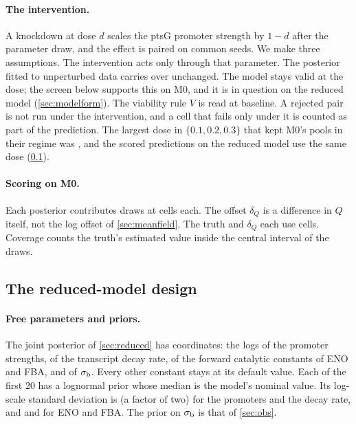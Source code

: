 \paragraph{The intervention.} A knockdown at dose $d$ scales the ptsG promoter strength
by $1 - d$ after the parameter draw, and the effect is paired on common seeds. We make three
assumptions. The intervention acts only through that parameter. The posterior fitted to
unperturbed data carries over unchanged. The model stays valid at the dose; the screen below supports this on M0, and it is in question on the reduced model (\cref{sec:modelform}). The viability rule $V$
is read at baseline. A rejected pair is not run under the intervention, and a cell that
fails only under it is counted as part of the prediction. The largest dose in
$\{0.1, 0.2, 0.3\}$ that kept M0's pools in their regime was , and the
scored predictions on the reduced model use the same dose (\cref{sec:reduceddesign}).

\paragraph{Scoring on M0.} Each posterior contributes  draws at
 cells each. The offset $\delta_Q$ is a difference in $Q$ itself, not the log offset of \cref{sec:meanfield}. The truth and $\delta_Q$ each use 
cells. Coverage counts the truth's estimated value inside the central interval of the
draws.

\subsection{The reduced-model design}
\label{sec:reduceddesign}

\paragraph{Free parameters and priors.} The joint posterior of \cref{sec:reduced} has
 coordinates: the logs of the  promoter strengths, of
the transcript decay rate, of the forward catalytic constants of ENO and FBA, and of
$\sigma_{\mathrm{b}}$. Every other constant stays at its default value. Each of the first 20 has a
lognormal prior whose median is the model's nominal value. Its log-scale standard deviation
is  (a factor of two) for the promoters and the decay rate, and 
and  for ENO and FBA. The prior on $\sigma_{\mathrm{b}}$ is that of \cref{sec:obs}.

